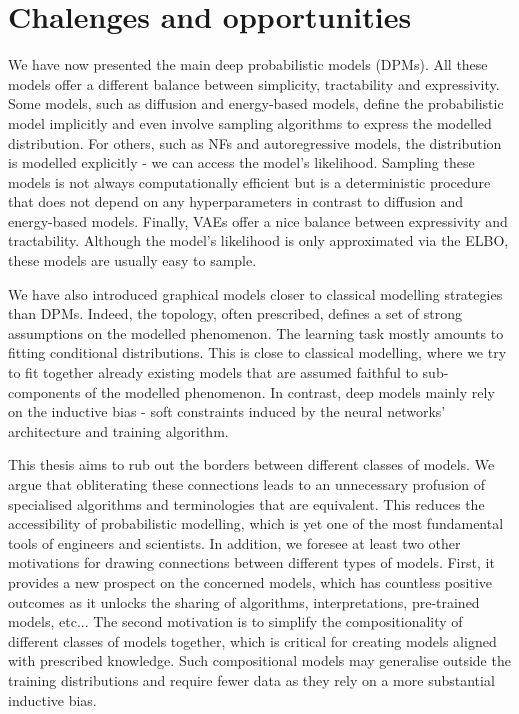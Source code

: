 
\section{Chalenges and opportunities}
We have now presented the main deep probabilistic models (DPMs). All these models offer a different balance between simplicity, tractability and expressivity. Some models, such as diffusion and energy-based models, define the probabilistic model implicitly and even involve sampling algorithms to express the modelled distribution. For others, such as NFs and autoregressive models, the distribution is modelled explicitly - we can access the model's likelihood. Sampling these models is not always computationally efficient but is a deterministic procedure that does not depend on any hyperparameters in contrast to diffusion and energy-based models. Finally, VAEs offer a nice balance between expressivity and tractability. Although the model's likelihood is only approximated via the ELBO, these models are usually easy to sample.

We have also introduced graphical models closer to classical modelling strategies than DPMs. Indeed, the topology, often prescribed, defines a set of strong assumptions on the modelled phenomenon. The learning task mostly amounts to fitting conditional distributions. This is close to classical modelling, where we try to fit together already existing models that are assumed faithful to sub-components of the modelled phenomenon. In contrast, deep models mainly rely on the inductive bias - soft constraints induced by the neural networks' architecture and training algorithm.

 This thesis aims to rub out the borders between different classes of models. We argue that obliterating these connections leads to an unnecessary profusion of specialised algorithms and terminologies that are equivalent. This reduces the accessibility of probabilistic modelling, which is yet one of the most fundamental tools of engineers and scientists. In addition, we foresee at least two other motivations for drawing connections between different types of models. First, it provides a new prospect on the concerned models, which has countless positive outcomes as it unlocks the sharing of algorithms, interpretations, pre-trained models, etc... The second motivation is to simplify the compositionality of different classes of models together, which is critical for creating models aligned with prescribed knowledge. Such compositional models may generalise outside the training distributions and require fewer data as they rely on a more substantial inductive bias.


